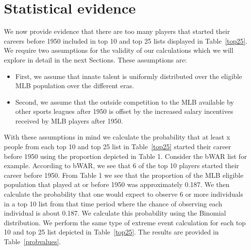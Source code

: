 \documentclass[11pt]{article}\usepackage[]{graphicx}\usepackage[]{color}
\begin{document}
\section{Statistical evidence}
\label{sec:Stats}

We now provide evidence that there are too many players that started their 
careers before 1950 included in top 10 and top 25 lists displayed 
in Table~\ref{top25}.  
We require two assumptions for the validity of our calculations which we will 
explore in detail in the next Sections. 
These assumptions are: 
\begin{itemize}
\item First, we assume that innate talent is uniformly distributed over the 
  eligible MLB population over the different eras.
\item Second, we assume that the outside competition to the MLB available by 
  other sports leagues after 1950 is offset by the increased salary 
  incentives received by MLB players after 1950.
\end{itemize}

With these assumptions in mind we calculate the probability that at least x 
people from each top 10 and top 25 list in Table~\ref{top25} started their 
career before 1950 using the proportion depicted in Table 1.  Consider the 
bWAR list for example.  According to bWAR, we see that 6 of the top 10 
players started their career before 1950.  From Table 1 we see that the 
proportion of the MLB eligible population that played at or  
before 1950 was approximately 0.187.  
We then calculate the probability that one would expect to observe 6 or more 
individuals in a top 10 list from that time period where the chance of 
observing each individual is about 0.187.  We calculate 
this probability using the Binomial distribution.%
We perform the same type of extreme event 
calculation for each top 10 and top 25 list depicted in Table~\ref{top25}.  
The results are provided in Table~\ref{probvalues}.
\end{document}
